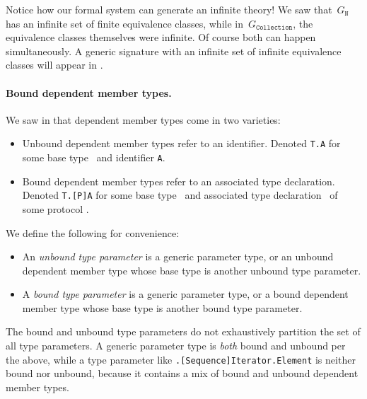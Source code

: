 \documentclass[../generics]{subfiles}
\begin{document}
Notice how our formal system can generate an infinite theory! We saw that~$G_\texttt{N}$ has an infinite set of finite equivalence classes, while in~$G_\texttt{Collection}$, the equivalence classes themselves were infinite. Of course both can happen simultaneously. A generic signature with an infinite set of infinite equivalence classes will appear in .

\paragraph{Bound dependent member types.}
We saw in  that dependent member types come in two varieties:
\begin{itemize}
\item {}Unbound dependent member types refer to an identifier. Denoted \texttt{T.A} for some base type \tT\ and identifier \texttt{A}.
\item {}Bound dependent member types refer to an associated type declaration. Denoted \texttt{T.[P]A} for some base type \tT\ and associated type declaration \nA\ of some protocol \tP.
\end{itemize}

\begin{definition}
We define the following for convenience:
\begin{itemize}
\item An \emph{unbound type parameter} is a generic parameter type, or an unbound dependent member type whose base type is another unbound type parameter.

\item A \emph{bound type parameter} is a generic parameter type, or a bound dependent member type whose base type is another bound type parameter.
\end{itemize}
The bound and unbound type parameters do not exhaustively partition the set of all type parameters. A generic parameter type is \emph{both} bound and unbound per the above, while a type parameter like \texttt{\rT.[Sequence]Iterator.Element} is neither bound nor unbound, because it contains a mix of bound and unbound dependent member types.
\end{definition}
\end{document}
